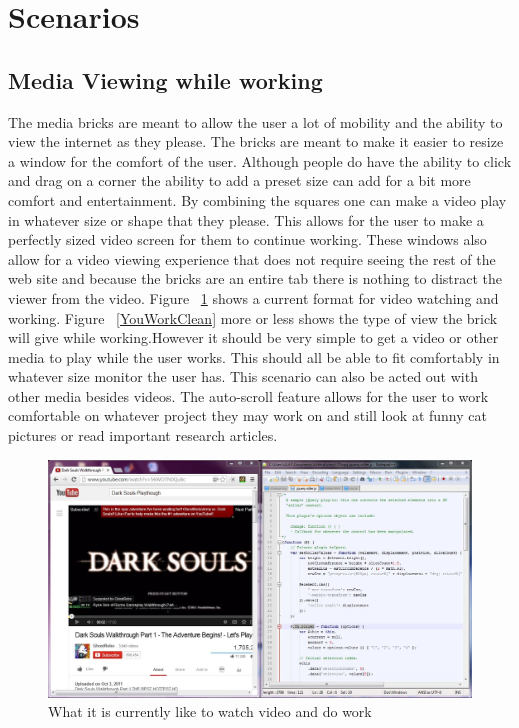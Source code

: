 \documentclass[11pt]{article}
\begin{document}
\section{Scenarios}


\subsection{Media Viewing while working}
The media bricks are meant to allow the user a lot of mobility and the ability to view the internet as they please. The bricks are meant to make it easier to resize a window for the comfort of the user. Although people do have the ability to click and drag on a corner the ability to add a preset size can add for a bit more comfort and entertainment. By combining the squares one can make a video play in whatever size or shape that they please. This allows for the user to make a perfectly sized video screen for them to continue working. These windows also allow for a video viewing experience that does not require seeing the rest of the web site and because the bricks are an entire tab there is nothing to distract the viewer from the video. Figure ~\ref{YouWork} shows a current format for video watching and working. Figure  ~\ref{YouWorkClean}  more or less shows the type of view the brick will give while working.However it should be very simple to get a video or other media to play while the user works. This should all be able to fit comfortably in whatever size monitor the user has. This scenario can also be acted out with other media besides videos. The auto-scroll feature allows for the user to work comfortable on whatever project they may work on and still look at funny cat pictures or read important research articles.

\begin{figure}[h!]
 \centering
    \includegraphics[width= 1\textwidth]{./Images/YoutubeWork}
  \caption{What it is currently like to watch video and do work}
 \label{YouWork}
\end{figure}
\end{document}
